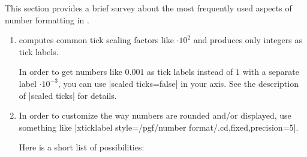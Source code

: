 This section provides a brief survey about the most frequently used aspects of
number formatting in \PGFPlots{}.
%
\begin{enumerate}
    \item \PGFPlots{} computes common tick scaling factors like $\cdot 10^2$
        and produces only integers as tick labels.

        In order to get numbers like $0.001$ as tick labels instead of $1$ with
        a separate label $\cdot 10^{-3}$, you can use |scaled ticks=false| in
        your axis. See the description of |scaled ticks| for details.
    \item In order to customize the way numbers are rounded and/or displayed,
        use something like
        |xticklabel style={/pgf/number format/.cd,fixed,precision=5}|.

        Here is a short list of possibilities:
\begin{codeexample}[]
\end{codeexample}

\begin{codeexample}[]
\end{codeexample}

\begin{codeexample}[]
\end{codeexample}

\begin{codeexample}[]
\end{codeexample}

\begin{codeexample}[]
\end{codeexample}

\begin{codeexample}[]
\end{codeexample}

\begin{codeexample}[]
\end{codeexample}

\begin{codeexample}[]
\end{codeexample}


\end{enumerate}
